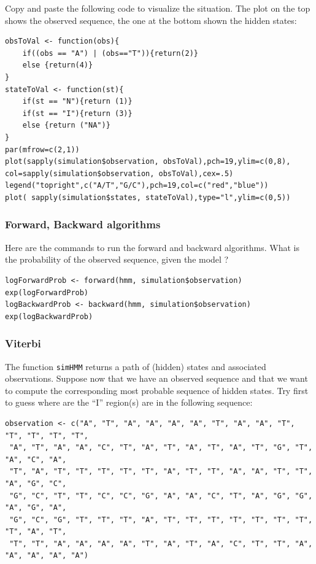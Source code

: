 \documentclass[a4paper,11pt]{article}
\begin{document}
Copy and paste the following code to visualize the situation. The plot on the top shows the observed sequence,
the one at the bottom shown the hidden states:

\begin{verbatim}
obsToVal <- function(obs){
	if((obs == "A") | (obs=="T")){return(2)}
	else {return(4)}
}
stateToVal <- function(st){
	if(st == "N"){return (1)}
	if(st == "I"){return (3)}
	else {return ("NA")}
}
par(mfrow=c(2,1))
plot(sapply(simulation$observation, obsToVal),pch=19,ylim=c(0,8),
col=sapply(simulation$observation, obsToVal),cex=.5)
legend("topright",c("A/T","G/C"),pch=19,col=c("red","blue"))
plot( sapply(simulation$states, stateToVal),type="l",ylim=c(0,5))
\end{verbatim}

\subsubsection{Forward, Backward algorithms}

Here are the commands to run the forward and backward algorithms. What is the probability of the observed sequence, given the model ? 

\begin{verbatim}
logForwardProb <- forward(hmm, simulation$observation)
exp(logForwardProb)
logBackwardProb <- backward(hmm, simulation$observation)
exp(logBackwardProb)
\end{verbatim}

\subsubsection{Viterbi}

The function \texttt{simHMM} returns a path of (hidden) states and associated observations. Suppose now that  we have an observed sequence and that we want to compute the corresponding most probable sequence of hidden states. Try first to guess where are the ``I'' region(s) are in the following sequence:

\begin{verbatim}
observation <- c("A", "T", "A", "A", "A", "A", "T", "A", "A", "T", "T", "T", "T", "T",
 "A", "T", "A", "A", "C", "T", "A", "T", "A", "T", "A", "T", "G", "T", "A", "C", "A", 
 "T", "A", "T", "T", "T", "T", "T", "A", "T", "T", "A", "A", "T", "T", "A", "G", "C", 
 "G", "C", "T", "T", "C", "C", "G", "A", "A", "C", "T", "A", "G", "G", "A", "G", "A", 
 "G", "C", "G", "T", "T", "T", "A", "T", "T", "T", "T", "T", "T", "T", "T", "A", "T", 
 "T", "T", "A", "A", "A", "A", "T", "A", "T", "A", "C", "T", "T", "A", "A", "A", "A", "A")
\end{verbatim}
\end{document}
